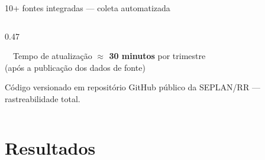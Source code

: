 \documentclass[aspectratio=169, 11pt]{beamer}
\begin{document}
\begin{frame}{10+ fontes integradas — coleta automatizada}
\begin{columns}[T]
\begin{column}{0.47\textwidth}
      \vspace{0.3cm}

      \begin{exampleblock}{\faClock\ \ Tempo de atualização}
        \centering
        \textbf{$\approx$ 30 minutos} por trimestre\\
        (após a publicação dos dados de fonte)
      \end{exampleblock}

      \vspace{0.2cm}
      {\small Código versionado em repositório GitHub público
      da SEPLAN/RR — rastreabilidade total.}
    \end{column}
  \end{columns}

\end{frame}

\section{Resultados}
\end{document}

